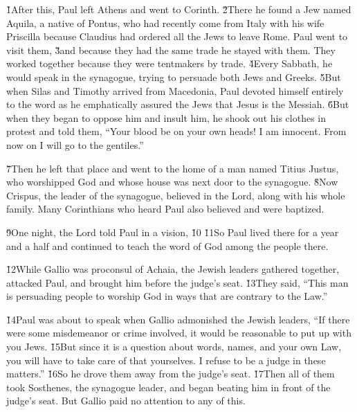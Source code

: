 \v{1}After this, Paul left Athens and went to Corinth. \v{2}There he found a Jew named Aquila, a native of Pontus, who had recently come from Italy with his wife Priscilla because Claudius had ordered all the Jews to leave Rome. Paul went to visit them, \v{3}and because they had the same trade he stayed with them. They worked together because they were tentmakers by trade. \v{4}Every Sabbath, he would speak in the synagogue, trying to persuade both Jews and Greeks. \v{5}But when Silas and Timothy arrived from Macedonia, Paul devoted himself entirely to the word as he emphatically assured the Jews that Jesus is the Messiah. \v{6}But when they began to oppose him and insult him, he shook out his clothes in protest and told them, ``Your blood be on your own heads! I am innocent. From now on I will go to the gentiles.''

\v{7}Then he left that place and went to the home of a man named Titius Justus, who worshipped God and whose house was next door to the synagogue. \v{8}Now Crispus, the leader of the synagogue, believed in the Lord, along with his whole family. Many Corinthians who heard Paul also believed and were baptized.

\v{9}One night, the Lord told Paul in a vision,  \v{10} \v{11}So Paul lived there for a year and a half and continued to teach the word of God among the people there.

\v{12}While Gallio was proconsul of Achaia, the Jewish leaders gathered together, attacked Paul, and brought him before the judge's seat. \v{13}They said, ``This man is persuading people to worship God in ways that are contrary to the Law.''

\v{14}Paul was about to speak when Gallio admonished the Jewish leaders, ``If there were some misdemeanor or crime involved, it would be reasonable to put up with you Jews. \v{15}But since it is a question about words, names, and your own Law, you will have to take care of that yourselves. I refuse to be a judge in these matters.'' \v{16}So he drove them away from the judge's seat. \v{17}Then all of them took Sosthenes, the synagogue leader, and began beating him in front of the judge's seat. But Gallio paid no attention to any of this.


